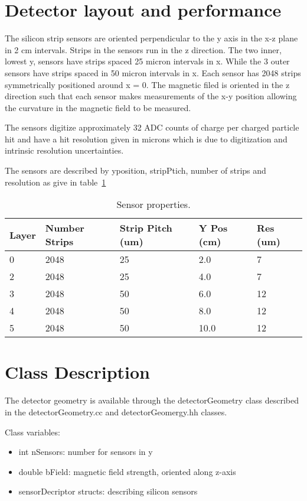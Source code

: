 \documentclass[aps,prd,superscriptaddress,floatfix]{revtex4}
\begin{document}
\section{Detector layout and performance}
The silicon strip sensors are oriented perpendicular to the y axis in
the x-z plane in 2 cm intervals.  Strips in the sensors run in the z
direction.  The two inner, lowest y,  sensors have strips spaced 25 micron
intervals in x. While the 3 outer sensors have strips spaced in 50 micron
intervals in x.  Each sensor has 2048 strips symmetrically positioned
around x = 0.  The magnetic filed is oriented in the z direction such
that each sensor makes measurements of the x-y position allowing
the curvature in the magnetic field to be measured.

The sensors digitize approximately 32 ADC counts of charge per charged
particle hit and have a hit resolution given in microns which is due to
digitization and intrinsic resolution uncertainties.

The sensors are described by yposition, stripPtich, number of strips
and resolution as give in table~\ref{tab:detectorTable}



\begin{table}
\caption{\label{tab:detectorTable} Sensor properties.}
\begin{tabular}{|l|l|l|l|l|}
\hline 
Layer & Number Strips & Strip Pitch (um) & Y Pos (cm) & Res (um)\\
\hline
0 & 2048 & 25	& 2.0 & 7	 \\
2 & 2048 & 25	& 4.0 & 7	 \\
3 & 2048 & 50	& 6.0 & 12	 \\
4 & 2048 & 50	& 8.0 & 12	 \\
5 & 2048 & 50	& 10.0 & 12	 \\
\hline
\end{tabular}
\end{table}

\section{Class Description}
The detector geometry is available through the detectorGeometry class
described in the detectorGeometry.cc and detectorGeomergy.hh classes.

Class variables:
\begin{itemize}
\item int nSensors: number for sensors in y
\item double bField: magnetic field strength, oriented along z-axis
\item sensorDecriptor structs: describing silicon sensors
\end{itemize}
\end{document}
